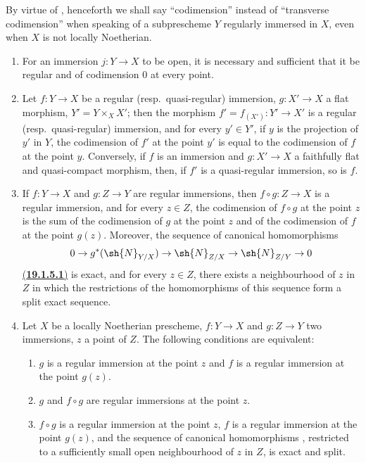 By virtue of , henceforth we shall say ``codimension'' instead of ``transverse codimension'' when speaking of a subprescheme $Y$ regularly immersed in $X$, even when $X$ is not locally Noetherian.

\begin{proposition}[19.1.5]
\label{IV.19.1.5}
\medskip\noindent
\begin{enumerate}[label=(\roman*)]
  \item For an immersion $j:Y\to X$ to be open, it is necessary and sufficient that it be regular and of codimension $0$ at every point.
  \item Let $f:Y\to X$ be a regular (resp.\ quasi-regular) immersion, $g:X'\to X$ a flat morphism, $Y'=Y\times_X X'$; then the morphism $f'=f_{(X')}:Y'\to X'$ is a regular (resp.\ quasi-regular) immersion, and for every $y'\in Y'$, if $y$ is the projection of $y'$ in $Y$, the codimension of $f'$ at the point $y'$ is equal to the codimension of $f$ at the point $y$.
Conversely, if $f$ is an immersion and $g:X'\to X$ a faithfully flat and quasi-compact morphism, then, if $f'$ is a quasi-regular immersion, so is $f$.
  \item If $f:Y\to X$ and $g:Z\to Y$ are regular immersions, then $f\circ g:Z\to X$ is a regular immersion, and for every $z\in Z$, the codimension of $f\circ g$ at the point $z$ is the sum of the codimension of $g$ at the point $z$ and of the codimension of $f$ at the point $g(z)$.
Moreover, the sequence of canonical homomorphisms 
\[
  0\to g^*(\sh{N}_{Y/X})\to\sh{N}_{Z/X}\to\sh{N}_{Z/Y}\to 0
\]
{\hyperlink{ega4.c04.item.19-1-5-1}{(\textbf{19.1.5.1})}}
\label{IV.19.1.5.1}
is exact, and for every $z\in Z$, there exists a neighbourhood of $z$ in $Z$ in which the restrictions of the homomorphisms of this sequence form a split exact sequence.
  \item Let $X$ be a locally Noetherian prescheme, $f:Y\to X$ and $g:Z\to Y$ two immersions, $z$ a point of $Z$.
The following conditions are equivalent:
  \begin{enumerate}[label=\emph{\alph*)}]
    \item $g$ is a regular immersion at the point $z$ and $f$ is a regular immersion at the point $g(z)$.
    \item $g$ and $f\circ g$ are regular immersions at the point $z$.
    \item $f\circ g$ is a regular immersion at the point $z$, $f$ is a regular immersion at the point $g(z)$, and the sequence of canonical homomorphisms , restricted to a sufficiently small open neighbourhood of $z$ in $Z$, is exact and split.

\end{enumerate}
\end{enumerate}
\end{proposition}
